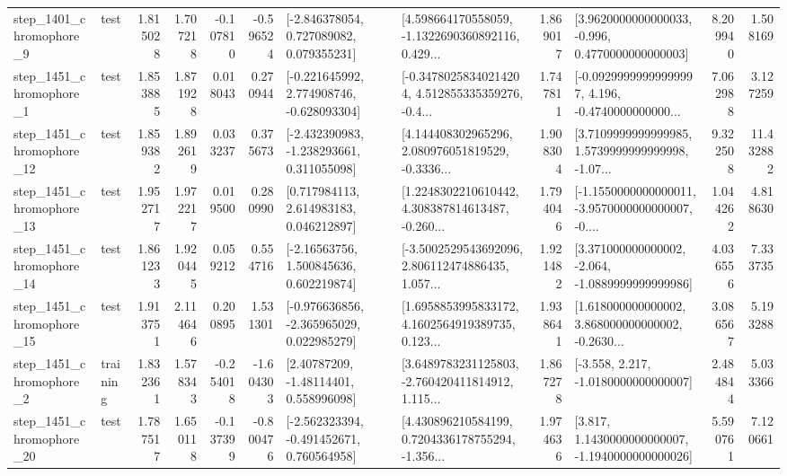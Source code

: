 \begin{tabular}{llrrrrllrlrr}
  step\_1401\_chromophore\_9 &      test &      1.815028 &    1.707218 &     -0.107810 & -0.596524 &    [-2.846378054, 0.727089082, 0.079355231] &  [4.598664170558059, -1.1322690360892116, 0.429... &       1.869017 &   [3.9620000000000033, -0.996, 0.4770000000000003] &            8.209940 &          1.508169 \\
  step\_1451\_chromophore\_1 &      test &      1.853885 &    1.871928 &      0.018043 &  0.270944 &   [-0.221645992, 2.774908746, -0.628093304] &  [-0.34780258340214204, 4.512855335359276, -0.4... &       1.747811 &  [-0.09299999999999997, 4.196, -0.4740000000000... &            7.062988 &          3.127259 \\
 step\_1451\_chromophore\_12 &      test &      1.859382 &    1.892619 &      0.033237 &  0.375673 &   [-2.432390983, -1.238293661, 0.311055098] &  [4.144408302965296, 2.080976051819529, -0.3336... &       1.908304 &  [3.7109999999999985, 1.5739999999999998, -1.07... &            9.322508 &         11.432882 \\
 step\_1451\_chromophore\_13 &      test &      1.952717 &    1.972217 &      0.019500 &  0.280990 &     [0.717984113, 2.614983183, 0.046212897] &  [1.2248302210610442, 4.308387814613487, -0.260... &       1.794046 &  [-1.1550000000000011, -3.9570000000000007, -0.... &            1.044262 &          4.818630 \\
 step\_1451\_chromophore\_14 &      test &      1.861233 &    1.920445 &      0.059212 &  0.554716 &     [-2.16563756, 1.500845636, 0.602219874] &  [-3.5002529543692096, 2.806112474886435, 1.057... &       1.921482 &   [3.371000000000002, -2.064, -1.0889999999999986] &            4.036556 &          7.333735 \\
 step\_1451\_chromophore\_15 &      test &      1.913751 &    2.114646 &      0.200895 &  1.531301 &   [-0.976636856, -2.365965029, 0.022985279] &  [1.6958853995833172, 4.1602564919389735, 0.123... &       1.938641 &  [1.618000000000002, 3.868000000000002, -0.2630... &            3.086567 &          5.193288 \\
  step\_1451\_chromophore\_2 &  training &      1.832361 &    1.578343 &     -0.254018 & -1.604303 &      [2.40787209, -1.48114401, 0.558996098] &  [3.6489783231125803, -2.760420411814912, 1.115... &       1.867278 &               [-3.558, 2.217, -1.0180000000000007] &            2.484844 &          5.033366 \\
 step\_1451\_chromophore\_20 &      test &      1.787517 &    1.650118 &     -0.137399 & -0.800476 &   [-2.562323394, -0.491452671, 0.760564958] &  [4.430896210584199, 0.7204336178755294, -1.356... &       1.974636 &   [3.817, 1.1430000000000007, -1.1940000000000026] &            5.590761 &          7.120661 \\

\end{tabular}
